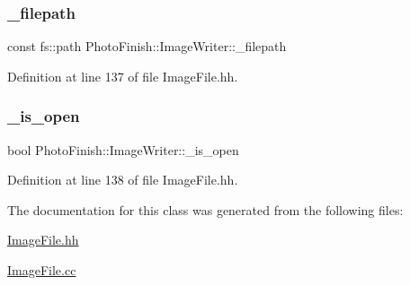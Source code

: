 \subsubsection{\texorpdfstring{\+\_\+filepath}{\_filepath}}
{\footnotesize\ttfamily const fs\+::path Photo\+Finish\+::\+Image\+Writer\+::\+\_\+filepath\hspace{0.3cm}{\ttfamily [protected]}}



Definition at line 137 of file Image\+File.\+hh.

\mbox{\label{class_photo_finish_1_1_image_writer_a5ccd6aefd5f71b9e204e2b4094d10d4f}} 
\subsubsection{\texorpdfstring{\+\_\+is\+\_\+open}{\_is\_open}}
{\footnotesize\ttfamily bool Photo\+Finish\+::\+Image\+Writer\+::\+\_\+is\+\_\+open\hspace{0.3cm}{\ttfamily [protected]}}



Definition at line 138 of file Image\+File.\+hh.



The documentation for this class was generated from the following files\+:\begin{DoxyCompactItemize}
\item 
\hyperlink{_image_file_8hh}{Image\+File.\+hh}\item 
\hyperlink{_image_file_8cc}{Image\+File.\+cc}\end{DoxyCompactItemize}
